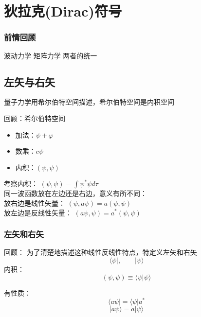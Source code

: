  
\section{狄拉克(Dirac)符号}

\begin{frame}
    \frametitle{前情回顾}
    \begin{itemize}
       \done 波动力学
       \done 矩阵力学
       \todo 两者的统一 
    \end{itemize}  
\end{frame} 

\subsection{左矢与右矢}

\begin{frame}
    量子力学用希尔伯特空间描述，希尔伯特空间是内积空间
    \begin{tcolorbox1}{回顾：希尔伯特空间}
    \begin{itemize}
        \item 加法：$\psi + \varphi$
        \item 数乘：$c\psi$
        \item 内积：$(\psi,\psi)$
    \end{itemize}
    \end{tcolorbox1}
    考察内积： $(\psi,\psi)=\int\psi^*\psi d\tau$ \\
    同一波函数放在左边还是右边，意义有所不同： \\
    放右边是线性矢量：  $(\psi,a\psi)=a (\psi,\psi)$ \\
    放左边是反线性矢量：   $(a\psi,\psi)=a^* (\psi,\psi)$   
\end{frame}

\begin{frame}
    \frametitle{左矢和右矢}
    \begin{tcolorbox1}{回顾：}
    为了清楚地描述这种线性反线性特点，特定义左矢和右矢
    $$\langle \psi |, \qquad |\psi \rangle $$ 
    内积：\[(\psi,\psi)\equiv \langle \psi | \psi \rangle\]

    有性质： $$\langle a\psi | = \langle \psi |a^* $$
    $$ |a\psi \rangle = a|\psi \rangle$$ 
    \end{tcolorbox1}
\end{frame} 

